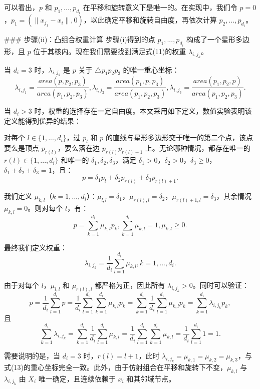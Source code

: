 \documentclass{ctexart}
\theoremstyle{proof}
\begin{document}
可以看出，$p$ 和 $p_1,...,p_{d_i}$ 在平移和旋转意义下是唯一的。在实现中，我们令 $p=0$，$p_1=(\|x_{j_1}-x_i\|,0)$，以此确定平移和旋转自由度，再依次计算 $p_2,...,p_{d_i}$。

### 步骤(ii)：凸组合权重计算
步骤(i)得到的点 $p_1,...,p_{d_i}$ 构成了一个星形多边形，且 $p$ 位于其核内。现在我们需要找到满足式(11)的权重 $\lambda_{i,j_k}$。

当 $d_i=3$ 时，$\lambda_{i,j_k}$ 是 $p$ 关于 $\triangle p_1p_2p_3$ 的唯一重心坐标：
\[
\lambda_{i, j_{1}}=\frac{area\left(p, p_{2}, p_{3}\right)}{area\left(p_{1}, p_{2}, p_{3}\right)}, \lambda_{i, j_{2}}=\frac{area\left(p_{1}, p, p_{3}\right)}{area\left(p_{1}, p_{2}, p_{3}\right)}, \lambda_{i, j_{3}}=\frac{area\left(p_{1}, p_{2}, p\right)}{area\left(p_{1}, p_{2}, p_{3}\right)} . \tag{13}
\]

当 $d_i>3$ 时，权重的选择存在一定自由度。本文采用如下定义，数值实验表明该定义能得到优异的结果：

对每个 $l \in \{1,...,d_i\}$，过 $p_l$ 和 $p$ 的直线与星形多边形交于唯一的第二个点，该点要么是顶点 $p_{r(l)}$，要么落在边 $p_{r(l)}p_{r(l)+1}$ 上。无论哪种情况，都存在唯一的 $r(l) \in \{1,...,d_i\}$ 和唯一的 $\delta_1,\delta_2,\delta_3$，满足 $\delta_1>0$，$\delta_2>0$，$\delta_3≥0$，$\delta_1+\delta_2+\delta_3=1$，且：
\[
p=\delta_{1} p_{l}+\delta_{2} p_{r(l)}+\delta_{3} p_{r(l)+1} .
\]

我们定义 $\mu_{k,l}$（$k=1,...,d_i$）：$\mu_{l,l}=\delta_1$，$\mu_{r(l),l}=\delta_2$，$\mu_{r(l)+1,l}=\delta_3$，其余情况 $\mu_{k,l}=0$。则对每个 $l$，有：
\[
p=\sum _{k=1}^{d_{i}}\mu _{k,l}p_{k}, \sum _{k=1}^{d_{i}}\mu _{k,l}=1, \mu _{k,l}\geq 0.
\]

最终我们定义权重：
\[
\lambda_{i, j_{k}}=\frac{1}{d_{i}} \sum_{l=1}^{d_{i}} \mu_{k, l}, k=1, ..., d_{i} . \tag{14}
\]

由于对每个 $l$，$\mu_{l,l}$ 和 $\mu_{r(l),l}$ 都严格为正，因此所有 $\lambda_{i,j_k}>0$。同时可以验证：
\[
p=\frac {1}{d_{i}}\sum _{l=1}^{d_{i}}p=\frac {1}{d_{i}}\sum _{l=1}^{d_{i}}\sum _{k=1}^{d_{i}}\mu _{k,l}p_{k}=\sum _{k=1}^{d_{i}}\frac {1}{d_{i}}\sum _{l=1}^{d_{i}}\mu _{k,l}p_{k}=\sum _{k=1}^{d_{i}}\lambda _{i,j_{k}}p_{k},
\]
且
\[
\sum_{k=1}^{d_{i}} \lambda_{i, j_{k}}=\sum_{k=1}^{d_{i}} \frac{1}{d_{i}} \sum_{l=1}^{d_{i}} \mu_{k, l}=\frac{1}{d_{i}} \sum_{l=1}^{d_{i}} \sum_{k=1}^{d_{i}} \mu_{k, l}=\frac{1}{d_{i}} \sum_{l=1}^{d_{i}} 1=1 .
\]

需要说明的是，当 $d_i=3$ 时，$r(l)=l+1$，此时 $\lambda_{i,j_k}=\mu_{k,1}=\mu_{k,2}=\mu_{k,3}$，与式(13)的重心坐标完全一致。此外，由于仿射组合在平移和旋转下不变，$\mu_{k,l}$ 与 $\lambda_{i,j_k}$ 由 $X_i$ 唯一确定，且连续依赖于 $x_i$ 和其邻域节点。
\end{document}
